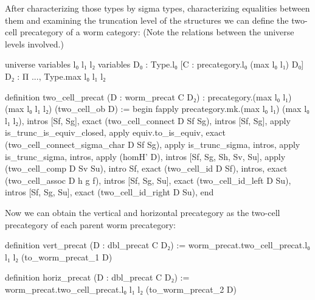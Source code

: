 After characterizing those types by sigma types, characterizing equalities between
them and examining the truncation level of the structures we can define the
two-cell precategory of a worm category: (Note the relations between the universe
levels involved.)
\begin{leancodebr}
universe variables l₀ l₁ l₂
variables {D₀ : Type.{l₀}} [C : precategory.{l₀ (max l₀ l₁)} D₀]
  {D₂ : Π ..., Type.{max l₀ l₁ l₂}}

definition two_cell_precat (D : worm_precat C D₂)
  : precategory.{(max l₀ l₁) (max l₀ l₁ l₂)} (two_cell_ob D) :=
begin
  fapply precategory.mk.{(max l₀ l₁) (max l₀ l₁ l₂)},
    intros [Sf, Sg], exact (two_cell_connect D Sf Sg),
    intros [Sf, Sg], apply is_trunc_is_equiv_closed, apply equiv.to_is_equiv,
      exact (two_cell_connect_sigma_char D Sf Sg),
      apply is_trunc_sigma, intros,
      apply is_trunc_sigma, intros, apply (homH' D),
    intros [Sf, Sg, Sh, Sv, Su], apply (two_cell_comp D Sv Su),
    intro Sf, exact (two_cell_id D Sf),
    intros, exact (two_cell_assoc D h g f),
    intros [Sf, Sg, Su], exact (two_cell_id_left D Su),
    intros [Sf, Sg, Su], exact (two_cell_id_right D Su),
end
\end{leancodebr}

Now we can obtain the vertical and horizontal precategory as the two-cell
precategory of each parent worm precategory:
\begin{leancode}
definition vert_precat (D : dbl_precat C D₂) :=
worm_precat.two_cell_precat.{l₀ l₁ l₂} (to_worm_precat_1 D)

definition horiz_precat (D : dbl_precat C D₂) :=
worm_precat.two_cell_precat.{l₀ l₁ l₂} (to_worm_precat_2 D)
\end{leancode}

